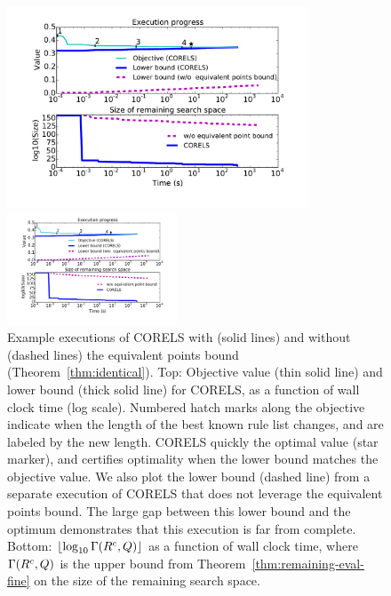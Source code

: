 \begin{figure}[t!]
\begin{center}
\begin{arxiv}
\includegraphics[width=0.8\textwidth]{figs/compas_execution-remaining-space.pdf}
\end{arxiv}
\begin{kdd}
\includegraphics[trim={20mm, 25mm, 10mm, 5mm}, width=0.45\textwidth]{figs/compas_execution-remaining-space.pdf}
\end{kdd}
\end{center}
\caption{Example executions of CORELS with (solid lines) and without
(dashed lines) the equivalent points bound (Theorem~\ref{thm:identical}).
%
Top: Objective value (thin solid line) and lower bound (thick solid line)
for CORELS, as a function of wall clock time (log scale).
%
Numbered hatch marks along the objective indicate when the length of
the best known rule list changes, and are labeled by the new length.
%
CORELS quickly the optimal value (star marker),
and certifies optimality when the lower bound matches the objective value.
%
We also plot the lower bound (dashed line) from a separate execution
of CORELS that does not leverage the equivalent points bound.
%
The large gap between this lower bound and the optimum
demonstrates that this execution is far from complete.
%
%
%
Bottom:
$\lfloor \log_{10} \Gamma({R^c}, Q) \rfloor$
as a function of wall clock time,
where~$\Gamma({R^c}, Q)$ is the upper bound
from Theorem~\ref{thm:remaining-eval-fine}
on the size of the remaining search space.}
\label{fig:objective}
\end{figure}


